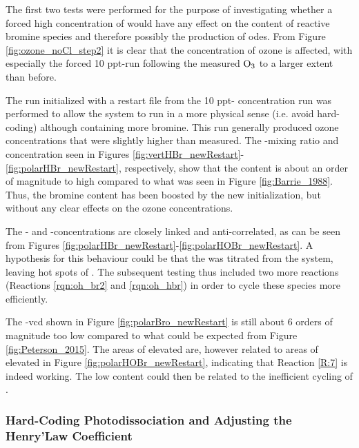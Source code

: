 The first two tests were performed for the purpose of investigating whether a forced high concentration of  would have any effect on the content of reactive bromine species and therefore possibly the production of \acrshort{ode}s. From Figure \ref{fig:ozone_noCl_step2} it is clear that the concentration of ozone is affected, with especially the forced 10 ppt-run following the measured $\mathrm{O_3}$ to a larger extent than before. 

\medskip

The run initialized with a restart file from the 10 ppt- concentration run was performed to allow the system to run in a more physical sense (i.e. avoid hard-coding) although containing more bromine. This run generally produced ozone concentrations that were slightly higher than measured. The -mixing ratio and concentration seen in Figures \ref{fig:vertHBr_newRestart}-\ref{fig:polarHBr_newRestart}, respectively, show that the content is about an order of magnitude to high compared to what was seen in Figure \ref{fig:Barrie_1988}. Thus, the bromine content has been boosted by the new initialization, but without any clear effects on the ozone concentrations. 

\medskip

The - and -concentrations are closely linked and anti-correlated, as can be seen from Figures \ref{fig:polarHBr_newRestart}-\ref{fig:polarHOBr_newRestart}. A hypothesis for this behaviour could be that the  was titrated from the system, leaving hot spots of . The subsequent testing thus included two more reactions (Reactions \ref{rqn:oh_br2} and \ref{rqn:oh_hbr}) in order to cycle these species more efficiently. 

\medskip

The -\acrshort{vcd} shown in Figure \ref{fig:polarBro_newRestart} is still about 6 orders of magnitude too low compared to what could be expected from Figure \ref{fig:Peterson_2015}. The areas of elevated  are, however related to areas of elevated  in Figure \ref{fig:polarHOBr_newRestart}, indicating that Reaction \ref{R:7} is indeed working. The low content could then be related to the inefficient cycling of . 


\subsubsection{Hard-Coding Photodissociation and Adjusting the Henry'Law Coefficient}\label{sec:disc_step3}

